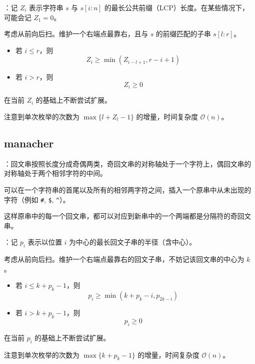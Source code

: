 ：记 $Z_i$ 表示字符串 $s$ 与 $s[i : n]$ 的最长公共前缀（LCP）长度。在某些情况下，可能会记 $Z_1 = 0$。

考虑从前向后扫。维护一个右端点最靠右，且与 $s$ 的前缀匹配的子串 $s[l : r]$。

\begin{itemize}
    \item 若 $i \leq r$，则
    \[
    Z_i \geq \min(Z_{i - l + 1}, r - i + 1)
    \]

    \item 若 $i > r$，则
    \[
    Z_i \geq 0
    \]
\end{itemize}

在当前 $Z_i$ 的基础上不断尝试扩展。

注意到单次枚举的次数为 $\max\{l + Z_l - 1\}$ 的增量，时间复杂度 $\mathcal{O}(n)$。


\subsection{manacher}

：回文串按照长度分成奇偶两类，奇回文串的对称轴处于一个字符上，偶回文串的对称轴处于两个相邻字符的中间。

可以在一个字符串的首尾以及所有的相邻两字符之间，插入一个原串中从未出现的字符（例如 \texttt{\#}, \texttt{\$}, \texttt{\textasciicircum{}}）。

这样原串中的每一个回文串，都可以对应到新串中的一个两端都是分隔符的奇回文串。

：记 $p_i$ 表示以位置 $i$ 为中心的最长回文子串的半径（含中心）。

考虑从前向后扫。维护一个右端点最靠右的回文子串，不妨记该回文串的中心为 $k$。

\begin{itemize}
    \item 若 $i \leq k + p_k - 1$，则
    \[
    p_i \geq \min(k + p_k - i, p_{2k - i})
    \]

    \item 若 $i > k + p_k - 1$，则
    \[
    p_i \geq 0
    \]
\end{itemize}

在当前 $p_i$ 的基础上不断尝试扩展。

注意到单次枚举的次数为 $\max\{k + p_k - 1\}$ 的增量，时间复杂度 $\mathcal{O}(n)$。


